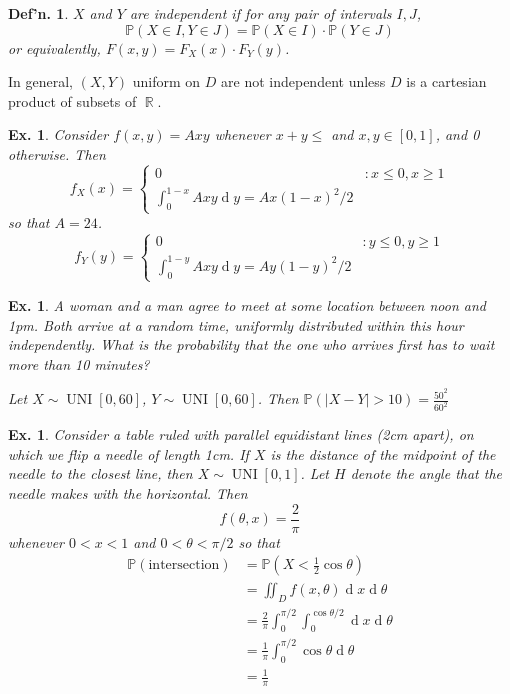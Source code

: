 \documentclass[12pt, a4paper]{book}
\DeclareMathOperator{\R}{\mathbb{R}}
\renewcommand{\Pr}{\mathbb{P}}
\renewcommand{\d}[1]{\ensuremath{\operatorname{d}\!{#1}}} %
\newtheorem{definition}[theorem]{Def'n.}
\newtheorem{example}[theorem]{Ex.}
\theoremstyle{nonumberplain}
\begin{document}
\begin{definition}
    $X$ and $Y$ are independent if for any pair of intervals $I,J$,
    \[\Pr(X\in I,Y\in J)=\Pr(X\in I)\cdot\Pr(Y\in J)\]
    or equivalently, $F(x,y)=F_X(x)\cdot F_Y(y)$.
\end{definition}
In general, $(X,Y)$ uniform on $D$ are not independent unless $D$ is a cartesian product of subsets of $\R$.
\begin{example}
    Consider $f(x,y)=Axy$ whenever $x+y\leq $ and $x,y\in[0,1]$, and 0 otherwise.
    Then
    \[f_X(x)=
        \begin{cases}
            0 &: x\leq 0, x\geq 1\\
            \int_0^{1-x}Axy\d{y}=Ax(1-x)^2/2
        \end{cases}
    \]
    so that $A=24$.
    \[f_Y(y)=
        \begin{cases}
            0 &: y\leq 0, y\geq 1\\
            \int_0^{1-y}Axy\d{y}=Ay(1-y)^2/2
        \end{cases}
    \]
\end{example}
\begin{example}
    A woman and a man agree to meet at some location between noon and 1pm.
    Both arrive at a random time, uniformly distributed within this hour independently.
    What is the probability that the one who arrives first has to wait more than 10 minutes?

    Let $X\sim\operatorname{UNI}[0,60]$, $Y\sim\operatorname{UNI}[0,60]$.
    Then $\Pr(|X-Y|>10)=\frac{50^2}{60^2}$
\end{example}
\begin{example}
    Consider a table ruled with parallel equidistant lines (2cm apart), on which we flip a needle of length 1cm.
    If $X$ is the distance of the midpoint of the needle to the closest line, then $X\sim\operatorname{UNI}[0,1]$.
    Let $H$ denote the angle that the needle makes with the horizontal.
    Then
    \[f(\theta,x)=\frac{2}{\pi}\]
    whenever $0<x<1$ and $0<\theta<\pi/2$ so that
    \begin{align*}
        \Pr(\text{intersection}) &= \Pr(X<\frac{1}{2}\cos\theta)\\
                                 &= \iint_D f(x,\theta)\d{x}\d{\theta}\\
                                 &= \frac{2}{\pi}\int_0^{\pi/2}\int_0^{\cos\theta/2}\d{x}\d{\theta}\\
                                 &= \frac{1}{\pi}\int_0^{\pi/2}\cos\theta\d{\theta}\\
                                 &= \frac{1}{\pi}
    \end{align*}
\end{example}
\end{document}
